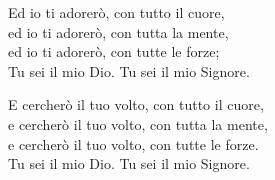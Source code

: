 
 

\spazio

\strofa Ed io ti adorerò, con tutto il cuore,\\
ed io ti adorerò, con tutta la mente,\\
ed io ti adorerò, con tutte le forze;\\
Tu sei il mio Dio. Tu sei il mio Signore.

\spazio


\spazio

\strofa E cercherò il tuo volto, con tutto il cuore,\\
e cercherò il tuo volto, con tutta la mente,\\
e cercherò il tuo volto, con tutte le forze.\\
Tu sei il mio Dio. Tu sei il mio Signore.